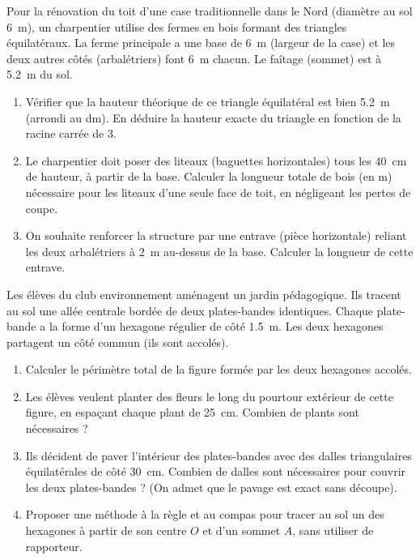 \documentclass[11pt]{article}
\begin{document}
\begin{exercice}
Pour la rénovation du toit d'une case traditionnelle dans le Nord (diamètre au sol \SI{6}{m}), un charpentier utilise des fermes en bois formant des triangles équilatéraux. La ferme principale a une base de \SI{6}{m} (largeur de la case) et les deux autres côtés (arbalétriers) font \SI{6}{m} chacun. Le faîtage (sommet) est à \SI{5,2}{m} du sol.
\begin{enumerate}
    \item Vérifier que la hauteur théorique de ce triangle équilatéral est bien \SI{5,2}{m} (arrondi au dm). En déduire la hauteur exacte du triangle en fonction de la racine carrée de 3.
    \item Le charpentier doit poser des liteaux (baguettes horizontales) tous les \SI{40}{cm} de hauteur, à partir de la base. Calculer la longueur totale de bois (en m) nécessaire pour les liteaux d'une seule face de toit, en négligeant les pertes de coupe.
    \item On souhaite renforcer la structure par une entrave (pièce horizontale) reliant les deux arbalétriers à \SI{2}{m} au-dessus de la base. Calculer la longueur de cette entrave.
\end{enumerate}
\end{exercice}

\begin{exercice}
Les élèves du club environnement aménagent un jardin pédagogique. Ils tracent au sol une allée centrale bordée de deux plates-bandes identiques. Chaque plate-bande a la forme d'un hexagone régulier de côté \SI{1,5}{m}. Les deux hexagones partagent un côté commun (ils sont accolés).
\begin{enumerate}
    \item Calculer le périmètre total de la figure formée par les deux hexagones accolés.
    \item Les élèves veulent planter des fleurs le long du pourtour extérieur de cette figure, en espaçant chaque plant de \SI{25}{cm}. Combien de plants sont nécessaires ?
    \item Ils décident de paver l'intérieur des plates-bandes avec des dalles triangulaires équilatérales de côté \SI{30}{cm}. Combien de dalles sont nécessaires pour couvrir les deux plates-bandes ? (On admet que le pavage est exact sans découpe).
    \item Proposer une méthode à la règle et au compas pour tracer au sol un des hexagones à partir de son centre $O$ et d'un sommet $A$, sans utiliser de rapporteur.
\end{enumerate}
\end{exercice}
\end{document}

